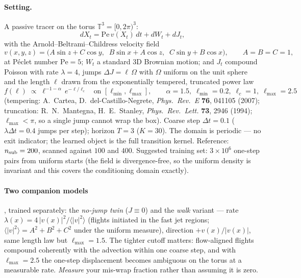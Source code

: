 \documentclass[11pt]{article}
\begin{document}
\paragraph{Setting.} A passive tracer on the torus
$\mathbb T^3=[0,2\pi)^3$:
\begin{equation*}
dX_t = \mathrm{Pe}\,v(X_t)\,dt + dW_t + dJ_t,
\end{equation*}
with the Arnold--Beltrami--Childress velocity field
\begin{equation*}
v(x,y,z)=\bigl(A\sin z + C\cos y,\;\; B\sin x + A\cos z,\;\;
C\sin y + B\cos x\bigr), \qquad A=B=C=1,
\end{equation*}
at P\'eclet number $\mathrm{Pe}=5$; $W_t$ a standard 3D Brownian motion;
and $J_t$ compound Poisson with rate $\lambda=4$, jumps
$\Delta J=\ell\,\Omega$ with $\Omega$ uniform on the unit sphere and the
length $\ell$ drawn from the exponentially tempered, truncated power law
\begin{equation*}
f(\ell)\;\propto\;\ell^{-1-\alpha}\,e^{-\ell/\ell_c}
\quad\text{on }[\ell_{\min},\ell_{\max}],
\qquad \alpha=1.5,\;\ell_{\min}=0.2,\;\ell_c=1,\;\ell_{\max}=2.5
\end{equation*}
(tempering: A.~Cartea, D.~del-Castillo-Negrete, \emph{Phys.\ Rev.\ E}
\textbf{76}, 041105 (2007); truncation: R.~N.~Mantegna, H.~E.~Stanley,
\emph{Phys.\ Rev.\ Lett.} \textbf{73}, 2946 (1994); $\ell_{\max}<\pi$, so
a single jump cannot wrap the box). Coarse step $\Delta t=0.1$
($\lambda\Delta t=0.4$ jumps per step); horizon $T=3$ ($K=30$). The
domain is periodic --- no exit indicator; the learned object is the full
transition kernel. Reference: $n_{\rm sub}=200$, scanned against $100$
and $400$. Suggested training set: $3\times10^6$ one-step pairs from
uniform starts (the field is divergence-free, so the uniform density is
invariant and this covers the conditioning domain exactly).

\paragraph{Two companion models}, trained separately: the \emph{no-jump
twin} ($J\equiv0$) and the \emph{walk} variant --- rate
$\lambda(x)=4\,|v(x)|^2/\langle|v|^2\rangle$ (flights initiated in the
fast jet regions; $\langle|v|^2\rangle=A^2+B^2+C^2$ under the uniform
measure), direction $+v(x)/|v(x)|$, same length law but
$\ell_{\max}=1.5$. The tighter cutoff matters: flow-aligned flights
compound coherently with the advection within one coarse step, and with
$\ell_{\max}=2.5$ the one-step displacement becomes ambiguous on the
torus at a measurable rate. \emph{Measure} your mis-wrap fraction rather
than assuming it is zero.
\end{document}
